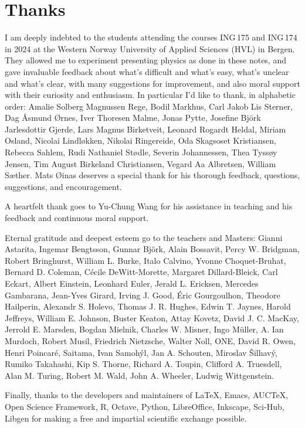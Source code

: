 \documentclass[a4paper,12pt,%
onecolumn,oneside,%
british%
]{memoir}
\newcommand{\addsec}[1]{\section*{#1}\addcontentsline{toc}{section}{#1}}
\renewcommand*{\|}[1][]{\nonscript\:#1\vert\nonscript\:\mathopen{}}
\begin{document}
\iftrue
\addsec{Thanks}
\label{sec:thanks}

I am deeply indebted to the students attending the courses ING\,175 and ING\,174 in 2024 at the Western Norway University of Applied Sciences (HVL) in Bergen. They allowed me to experiment presenting physics as done in these notes, and gave invaluable feedback about what's difficult and what's easy, what's unclear and what's clear, with many suggestions for improvement, and also moral support with their curiosity and enthusiasm. In particular I'd like to thank, in alphabetic order: %
Amalie Solberg Magnussen Rege, %
Bodil Markhus, %
Carl Jakob Lis Sterner, %
Dag Åsmund Ørnes, %
Iver Thoresen Malme, %
Jonas Pytte, %
Josefine Björk Jarlesdottir Gjerde, %
Lars Magnus Birketveit, %
Leonard Rogardt Heldal, %
Miriam Osland, %
Nicolai Lindløkken, %
Nikolai Ringereide, %
Oda Skagsoset Kristiansen, %
Rebecca Sahlem, %
Rudi Nathaniel Stødle, %
Severin Johannessen, %
Thea Tyssøy Jensen, %
Tim August Birkeland Christiansen, %
Vegard Aa Albretsen, %
William Sæther. %
Mats Øinas deserves a special thank for his thorough feedback, questions, suggestions, and encouragement.

A heartfelt thank goes to Yu-Chung Wang for his assistance in teaching and his feedback and continuous moral support.

Eternal gratitude and deepest esteem go to the teachers and Masters:
Gianni Astarita,
Ingemar Bengtsson,
Gunnar Bj\"ork,
Alain Bossavit,
Percy W. Bridgman,
Robert Bringhurst,
William L. Burke,
Italo Calvino,
Yvonne Choquet-Bruhat,
Bernard D. Coleman,
C\'ecile DeWitt-Morette,
Margaret Dillard-Bleick,
Carl Eckart,
Albert Einstein,
Leonhard Euler,
Jerald L. Ericksen,
Mercedes Gambarana,
Jean-Yves Girard,
Irving J. Good,
\'Eric Gourgoulhon,
Theodore Hailperin,
Alexandr S. Holevo,
Thomas J. R. Hughes,
Edwin T. Jaynes,
Harold Jeffreys,
William E. Johnson,
Buster Keaton,
Attay Kovetz,
David J. C. MacKay,
Jerrold E. Marsden,
Bogdan Mielnik,
Charles W. Misner,
Ingo M\"uller,
A. Ian Murdoch,
Robert Musil,
Friedrich Nietzsche,
Walter Noll,
ONE,
David R. Owen,
Henri Poincar\'e,
Saitama,
Ivan Samoh\'yl,
Jan A. Schouten,
Miroslav \v{S}ilhav\'y,
Rumiko Takahashi,
Kip S. Thorne,
Richard A. Toupin,
Clifford A. Truesdell,
Alan M. Turing,
Robert M. Wald,
John A. Wheeler,
Ludwig Wittgenstein.

Finally, thanks to the developers and maintainers of \LaTeX, Emacs, AUC\TeX, Open Science Framework, R, Octave, Python, LibreOffice, Inkscape, Sci-Hub, Libgen for making a free and impartial scientific exchange possible.
\fi
\end{document}
